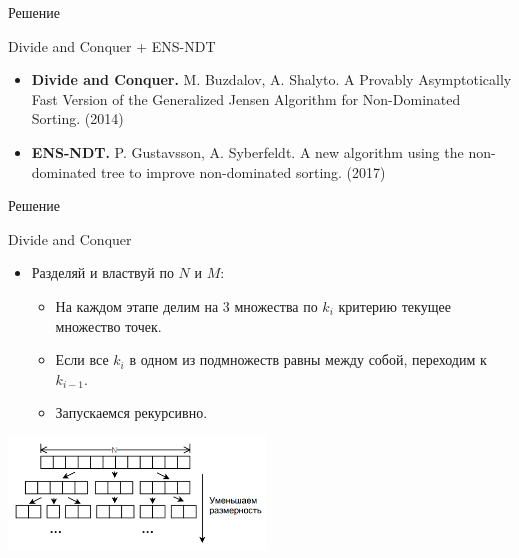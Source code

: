 \documentclass[table]{beamer}
\begin{document}
\begin{frame}{Решение}
\begin{block}{Divide and Conquer + ENS-NDT}
\begin{center}
\end{center}
\begin{itemize}
\item \textbf{Divide and Conquer.} M. Buzdalov, A. Shalyto. A Provably Asymptotically Fast Version of the Generalized Jensen Algorithm for Non-Dominated Sorting. (2014)
\item \textbf{ENS-NDT.} P. Gustavsson, A. Syberfeldt. A new algorithm using the non-dominated tree to improve non-dominated sorting. (2017)
\end{itemize}
\end{block}
\end{frame}

\begin{frame}{Решение}
\begin{block}{Divide and Conquer}
\begin{itemize}
\item Разделяй и властвуй по $N$ и $M$:
\begin{itemize}
\item На каждом этапе делим на 3 множества по $k_i$ критерию текущее множество точек.
\item Если все $k_i$ в одном из подмножеств равны между собой, переходим к $k_{i-1}$.
\item Запускаемся рекурсивно.
\end{itemize}
\end{itemize}
\begin{center}
\includegraphics*[height=3cm]{pic/fast_pic.png}
\end{center}
\end{block}
\end{frame}
\end{document}
